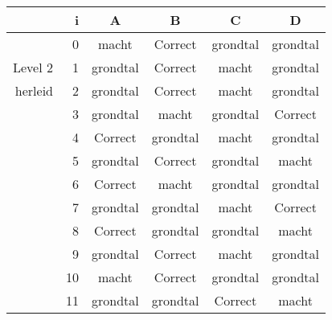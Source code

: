 \begin{tabular}{ rr| c|c|c|c}\hline\hline
     & i & \textbf{A} & \textbf{B} & \textbf{C} & \textbf{D}\\\hline

&0&macht&Correct\cellcolor[gray]{0.6}&grondtal&grondtal\\
Level 2 & 1&grondtal&Correct\cellcolor[gray]{0.6}&macht&grondtal\\
herleid &2&grondtal&Correct\cellcolor[gray]{0.6}&macht&grondtal\\
&3&grondtal&macht&grondtal&Correct\cellcolor[gray]{0.6}\\
&4&Correct\cellcolor[gray]{0.6}&grondtal&macht&grondtal\\
&5&grondtal&Correct\cellcolor[gray]{0.6}&grondtal&macht\\
&6&Correct\cellcolor[gray]{0.6}&macht&grondtal&grondtal\\
&7&grondtal&grondtal&macht&Correct\cellcolor[gray]{0.6}\\
&8&Correct\cellcolor[gray]{0.6}&grondtal&grondtal&macht\\
&9&grondtal&Correct\cellcolor[gray]{0.6}&macht&grondtal\\
&10&macht&Correct\cellcolor[gray]{0.6}&grondtal&grondtal\\
&11&grondtal&grondtal&Correct\cellcolor[gray]{0.6}&macht\\
\hline\end{tabular}\par\ \newline

